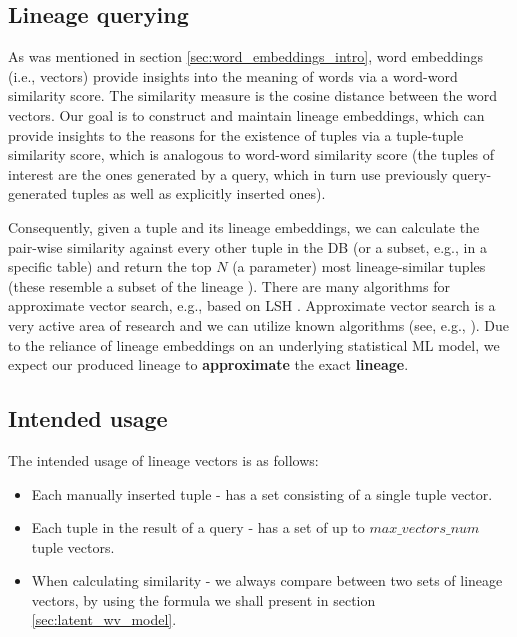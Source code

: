 \subsection{Lineage querying} As was mentioned in section \ref{sec:word_embeddings_intro}, word embeddings (i.e., vectors) provide insights into the meaning of words via a word-word similarity score. The similarity measure is the cosine distance between the word vectors. Our goal is to construct and maintain lineage embeddings, which can provide insights to the reasons for the existence of tuples via a tuple-tuple similarity score, which is analogous to word-word similarity score (the tuples of interest are the ones generated by a query, which in turn use previously query-generated tuples as well as explicitly inserted ones).
\par Consequently, given a tuple and its lineage embeddings, we can calculate the pair-wise similarity against every other tuple in the DB (or a subset, e.g., in a specific table) and return the top $N$ (a parameter) most lineage-similar tuples (these resemble a subset of the lineage \cite{Cui:2000:TLV:357775.357777}). 
There are many algorithms for approximate vector search, e.g., based on LSH \cite{lsh}. Approximate vector search is a very active area of research and we can utilize known algorithms (see, e.g., \cite{sugawara-etal-2016-approximately}).
Due to the reliance of lineage embeddings on an underlying statistical ML model, we expect our produced lineage to \textbf{approximate} the exact \textbf{lineage}.\\


\subsection{Intended usage} The intended usage of lineage vectors is as follows:
\begin{itemize}
    \item Each manually inserted tuple - has a set consisting of a single tuple vector.
    \item Each tuple in the result of a query - has a set of up to $max\_vectors\_num$ tuple vectors.
    \item When calculating similarity - we always compare between two sets of lineage vectors, by using the formula we shall present in section \ref{sec:latent_wv_model}.
\end{itemize}

